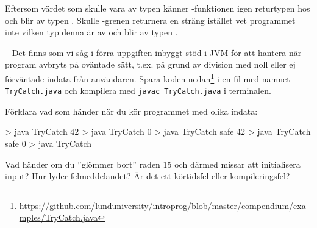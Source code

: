 \SubtaskSolved  Eftersom värdet som skulle vara av typen  känner -funktionen igen returtypen hos  och  blir av typen . Skulle -grenen returnera en sträng istället vet programmet inte vilken typ denna är av och  blir av typen .



\QUESTEND







\QUESTBEGIN

\Task \label{task:javatry} \what~   Det finns som vi såg i förra uppgiften inbyggt stöd i JVM för att hantera när program avbryts på oväntade sätt, t.ex. på grund av division med noll eller ej förväntade indata från användaren. Spara koden nedan\footnote{\url{https://github.com/lunduniversity/introprog/blob/master/compendium/examples/TryCatch.java}} i en fil med namnet \texttt{TryCatch.java} och kompilera med \texttt{javac TryCatch.java} i terminalen.


\Subtask Förklara vad som händer när du kör programmet med olika indata:
\begin{REPL}
> java TryCatch 42
> java TryCatch 0
> java TryCatch safe 42
> java TryCatch safe 0
> java TryCatch
\end{REPL}

\Subtask Vad händer om du ''glömmer bort'' raden 15 och därmed missar att initialisera input? Hur lyder felmeddelandet? Är det ett körtidsfel eller kompileringsfel?




\SOLUTION


\TaskSolved \what


